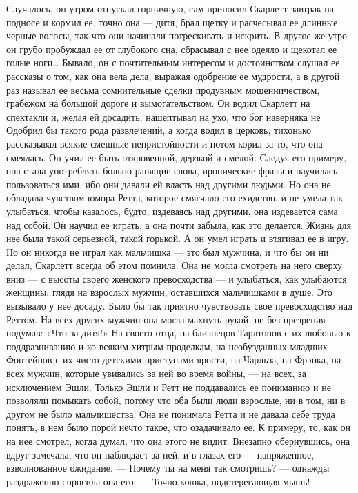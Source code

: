 Случалось, он утром отпускал горничную, сам приносил Скарлетт завтрак на подносе и кормил ее, точно она — дитя, брал щетку и расчесывал ее длинные черные волосы, так что они начинали потрескивать и искрить. В другое же утро он грубо пробуждал ее от глубокого сна, сбрасывал с нее одеяло и щекотал ее голые ноги… Бывало, он с почтительным интересом и достоинством слушал ее рассказы о том, как она вела дела, выражая одобрение ее мудрости, а в другой раз называл ее весьма сомнительные сделки продувным мошенничеством, грабежом на большой дороге и вымогательством. Он водил Скарлетт на спектакли и, желая ей досадить, нашептывал на ухо, что бог наверняка не Одобрил бы такого рода развлечений, а когда водил в церковь, тихонько рассказывал всякие смешные непристойности и потом корил за то, что она смеялась. Он учил ее быть откровенной, дерзкой и смелой. Следуя его примеру, она стала употреблять больно ранящие слова, иронические фразы и научилась пользоваться ими, ибо они давали ей власть над другими людьми. Но она не обладала чувством юмора Ретта, которое смягчало его ехидство, и не умела так улыбаться, чтобы казалось, будто, издеваясь над другими, она издевается сама над собой.
Он научил ее играть, а она почти забыла, как это делается. Жизнь для нее была такой серьезной, такой горькой. А он умел играть и втягивал ее в игру. Но он никогда не играл как мальчишка — это был мужчина, и что бы он ни делал, Скарлетт всегда об этом помнила. Она не могла смотреть на него сверху вниз — с высоты своего женского превосходства — и улыбаться, как улыбаются женщины, глядя на взрослых мужчин, оставшихся мальчишками в душе.
Это вызывало у нее досаду. Было бы так приятно чувствовать свое превосходство над Реттом. На всех других мужчин она могла махнуть рукой, не без презрения подумав: «Что за дитя!» На своего отца, на близнецов Тарлтонов с их любовью к поддразниванию и ко всяким хитрым проделкам, на необузданных младших Фонтейнов с их чисто детскими приступами ярости, на Чарльза, на Фрэнка, на всех мужчин, которые увивались за ней во время войны, — на всех, за исключением Эшли. Только Эшли и Ретт не поддавались ее пониманию и не позволяли помыкать собой, потому что оба были люди взрослые, ни в том, ни в другом не было мальчишества.
Она не понимала Ретта и не давала себе труда понять, в нем было порой нечто такое, что озадачивало ее. К примеру, то, как он на нее смотрел, когда думал, что она этого не видит. Внезапно обернувшись, она вдруг замечала, что он наблюдает за ней, и в глазах его — напряженное, взволнованное ожидание.
— Почему ты на меня так смотришь? — однажды раздраженно спросила она его. — Точно кошка, подстерегающая мышь!
